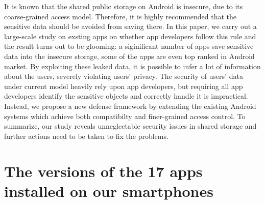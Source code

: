 \documentclass{sig-alternate}
\begin{document}
It is known that the shared public storage on Android is insecure, due to its coarse-grained access model. Therefore, it is highly recommended that the sensitive data should be avoided from saving there. In this paper, we carry out a large-scale study on exsting apps on whether app developers follow this rule and the result turns out to be glooming: a siginificant number of apps save sensitive data into the insecure storage, some of the apps are even top ranked in Android market. By exploiting these leaked data, it is possible to infer a lot of information about the users, severely violating users' privacy. The security of users' data under current model heavily rely upon app developers, but requiring all app developers identify the sensitive objects and correctly handle it is impractical. Instead, we propose a new defense framework by extending the existing Android systems which achieve both compatibilty and finer-grained access control. To summarize, our study reveals unneglectable security issues in shared storage and further actions need to be taken to fix the problems.




\appendix
\section{The versions of the 17 apps installed on our smartphones}
\label{appendix1}
\end{document}
